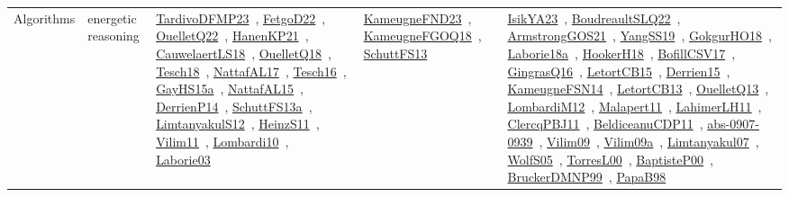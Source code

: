 {\begin{longtable}{lp{3cm}>{\raggedright\arraybackslash}p{6cm}>{\raggedright\arraybackslash}p{6cm}>{\raggedright\arraybackslash}p{8cm}}
Algorithms & energetic reasoning & \href{works/TardivoDFMP23.pdf}{TardivoDFMP23}~\cite{TardivoDFMP23}, \href{works/FetgoD22.pdf}{FetgoD22}~\cite{FetgoD22}, \href{works/OuelletQ22.pdf}{OuelletQ22}~\cite{OuelletQ22}, \href{works/HanenKP21.pdf}{HanenKP21}~\cite{HanenKP21}, \href{works/CauwelaertLS18.pdf}{CauwelaertLS18}~\cite{CauwelaertLS18}, \href{works/OuelletQ18.pdf}{OuelletQ18}~\cite{OuelletQ18}, \href{works/Tesch18.pdf}{Tesch18}~\cite{Tesch18}, \href{works/NattafAL17.pdf}{NattafAL17}~\cite{NattafAL17}, \href{works/Tesch16.pdf}{Tesch16}~\cite{Tesch16}, \href{works/GayHS15a.pdf}{GayHS15a}~\cite{GayHS15a}, \href{works/NattafAL15.pdf}{NattafAL15}~\cite{NattafAL15}, \href{works/DerrienP14.pdf}{DerrienP14}~\cite{DerrienP14}, \href{works/SchuttFS13a.pdf}{SchuttFS13a}~\cite{SchuttFS13a}, \href{works/LimtanyakulS12.pdf}{LimtanyakulS12}~\cite{LimtanyakulS12}, \href{works/HeinzS11.pdf}{HeinzS11}~\cite{HeinzS11}, \href{works/Vilim11.pdf}{Vilim11}~\cite{Vilim11}, \href{works/Lombardi10.pdf}{Lombardi10}~\cite{Lombardi10}, \href{works/Laborie03.pdf}{Laborie03}~\cite{Laborie03} & \href{works/KameugneFND23.pdf}{KameugneFND23}~\cite{KameugneFND23}, \href{works/KameugneFGOQ18.pdf}{KameugneFGOQ18}~\cite{KameugneFGOQ18}, \href{works/SchuttFS13.pdf}{SchuttFS13}~\cite{SchuttFS13} & \href{works/IsikYA23.pdf}{IsikYA23}~\cite{IsikYA23}, \href{works/BoudreaultSLQ22.pdf}{BoudreaultSLQ22}~\cite{BoudreaultSLQ22}, \href{works/ArmstrongGOS21.pdf}{ArmstrongGOS21}~\cite{ArmstrongGOS21}, \href{works/YangSS19.pdf}{YangSS19}~\cite{YangSS19}, \href{works/GokgurHO18.pdf}{GokgurHO18}~\cite{GokgurHO18}, \href{works/Laborie18a.pdf}{Laborie18a}~\cite{Laborie18a}, \href{works/HookerH18.pdf}{HookerH18}~\cite{HookerH18}, \href{works/BofillCSV17.pdf}{BofillCSV17}~\cite{BofillCSV17}, \href{works/GingrasQ16.pdf}{GingrasQ16}~\cite{GingrasQ16}, \href{works/LetortCB15.pdf}{LetortCB15}~\cite{LetortCB15}, \href{works/Derrien15.pdf}{Derrien15}~\cite{Derrien15}, \href{works/KameugneFSN14.pdf}{KameugneFSN14}~\cite{KameugneFSN14}, \href{works/LetortCB13.pdf}{LetortCB13}~\cite{LetortCB13}, \href{works/OuelletQ13.pdf}{OuelletQ13}~\cite{OuelletQ13}, \href{works/LombardiM12.pdf}{LombardiM12}~\cite{LombardiM12}, \href{works/Malapert11.pdf}{Malapert11}~\cite{Malapert11}, \href{works/LahimerLH11.pdf}{LahimerLH11}~\cite{LahimerLH11}, \href{works/ClercqPBJ11.pdf}{ClercqPBJ11}~\cite{ClercqPBJ11}, \href{works/BeldiceanuCDP11.pdf}{BeldiceanuCDP11}~\cite{BeldiceanuCDP11}, \href{works/abs-0907-0939.pdf}{abs-0907-0939}~\cite{abs-0907-0939}, \href{works/Vilim09.pdf}{Vilim09}~\cite{Vilim09}, \href{works/Vilim09a.pdf}{Vilim09a}~\cite{Vilim09a}, \href{works/Limtanyakul07.pdf}{Limtanyakul07}~\cite{Limtanyakul07}, \href{works/WolfS05.pdf}{WolfS05}~\cite{WolfS05}, \href{works/TorresL00.pdf}{TorresL00}~\cite{TorresL00}, \href{works/BaptisteP00.pdf}{BaptisteP00}~\cite{BaptisteP00}, \href{works/BruckerDMNP99.pdf}{BruckerDMNP99}~\cite{BruckerDMNP99}, \href{works/PapaB98.pdf}{PapaB98}~\cite{PapaB98}\\

\end{longtable}}
